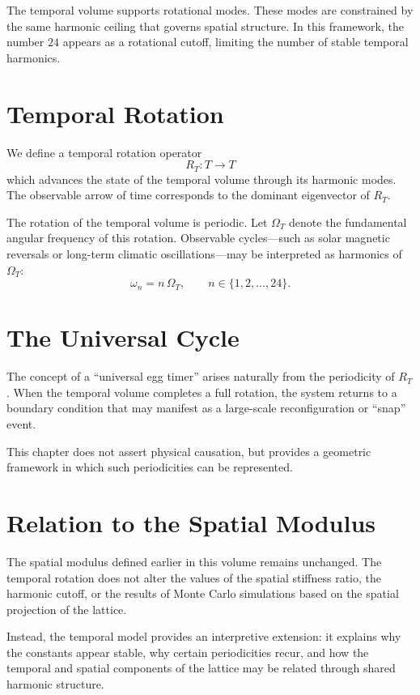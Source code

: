 \documentclass[11pt, letterpaper, openany]{book}
\begin{document}
The temporal volume supports rotational modes. These modes are constrained by 
the same harmonic ceiling that governs spatial structure. In this framework, 
the number $24$ appears as a rotational cutoff, limiting the number of stable 
temporal harmonics.

\section{Temporal Rotation}

We define a temporal rotation operator
\[
R_T : T \rightarrow T
\]
which advances the state of the temporal volume through its harmonic modes. 
The observable arrow of time corresponds to the dominant eigenvector of $R_T$.

The rotation of the temporal volume is periodic. Let $\Omega_T$ denote the 
fundamental angular frequency of this rotation. Observable cycles---such as 
solar magnetic reversals or long-term climatic oscillations---may be 
interpreted as harmonics of $\Omega_T$:
\[
\omega_n = n \, \Omega_T, \qquad n \in \{1, 2, \dots, 24\}.
\]

\section{The Universal Cycle}

The concept of a ``universal egg timer'' arises naturally from the periodicity 
of $R_T$. When the temporal volume completes a full rotation, the system 
returns to a boundary condition that may manifest as a large-scale 
reconfiguration or ``snap'' event.

This chapter does not assert physical causation, but provides a geometric 
framework in which such periodicities can be represented.

\section{Relation to the Spatial Modulus}

The spatial modulus defined earlier in this volume remains unchanged. The 
temporal rotation does not alter the values of the spatial stiffness ratio, 
the harmonic cutoff, or the results of Monte Carlo simulations based on the 
spatial projection of the lattice.

Instead, the temporal model provides an interpretive extension: it explains 
why the constants appear stable, why certain periodicities recur, and how the 
temporal and spatial components of the lattice may be related through shared 
harmonic structure.
\end{document}
